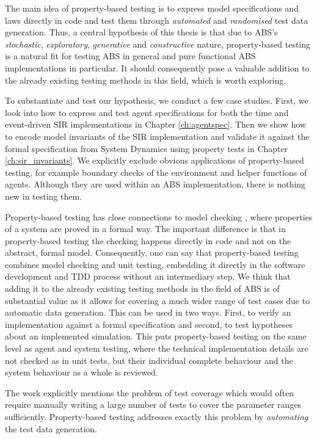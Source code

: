 \medskip

The main idea of property-based testing is to express model specifications and laws directly in code and test them through \textit{automated} and \textit{randomised} test data generation. Thus, a central hypothesis of this thesis is that due to ABS's \textit{stochastic}, \textit{exploratory}, \textit{generative} and \textit{constructive} nature, property-based testing is a natural fit for testing ABS in general and pure functional ABS implementations in particular. It should consequently pose a valuable addition to the already existing testing methods in this field, which is worth exploring.

To substantiate and test our hypothesis, we conduct a few case studies. First, we look into how to express and test agent specifications for both the time and event-driven SIR implementations in Chapter \ref{ch:agentspec}. Then we show how to encode model invariants of the SIR implementation and validate it against the formal specification from System Dynamics using property tests in Chapter \ref{ch:sir_invariants}. We explicitly exclude obvious applications of property-based testing, for example boundary checks of the environment and helper functions of agents. Although they are used within an ABS implementation, there is nothing new in testing them.

\medskip

Property-based testing has close connections to model checking \cite{mcmillan_symbolic_1993}, where properties of a system are proved in a formal way. The important difference is that in property-based testing the checking happens directly in code and not on the abstract, formal model. Consequently, one can say that property-based testing combines model checking and unit testing, embedding it directly in the software development and TDD process without an intermediary step. We think that adding it to the already existing testing methods in the field of ABS is of substantial value as it allows for covering a much wider range of test cases due to automatic data generation. This can be used in two ways. First, to verify an implementation against a formal specification and second, to test hypotheses about an implemented simulation. This puts property-based testing on the same level as agent and system testing, where the technical implementation details are not checked as in unit tests, but their individual complete behaviour and the system behaviour as a whole is reviewed.

The work \cite{onggo_test-driven_2016} explicitly mentions the problem of test coverage which would often require manually writing a large number of tests to cover the parameter ranges sufficiently. Property-based testing addresses exactly this problem by \textit{automating} the test data generation.


